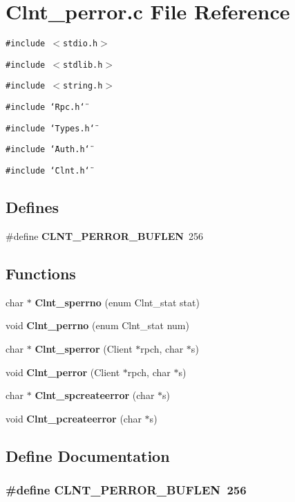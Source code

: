 \section{Clnt\_\-perror.c File Reference}
\label{Clnt__perror_8c}
{\tt \#include $<$stdio.h$>$}\par
{\tt \#include $<$stdlib.h$>$}\par
{\tt \#include $<$string.h$>$}\par
{\tt \#include \char`\"{}Rpc.h\char`\"{}}\par
{\tt \#include \char`\"{}Types.h\char`\"{}}\par
{\tt \#include \char`\"{}Auth.h\char`\"{}}\par
{\tt \#include \char`\"{}Clnt.h\char`\"{}}\par
\subsection*{Defines}
\begin{CompactItemize}
\item 
\#define {\bf CLNT\_\-PERROR\_\-BUFLEN}\ 256
\end{CompactItemize}
\subsection*{Functions}
\begin{CompactItemize}
\item 
char $\ast$ {\bf Clnt\_\-sperrno} (enum Clnt\_\-stat stat)
\item 
void {\bf Clnt\_\-perrno} (enum Clnt\_\-stat num)
\item 
char $\ast$ {\bf Clnt\_\-sperror} (Client $\ast$rpch, char $\ast$s)
\item 
void {\bf Clnt\_\-perror} (Client $\ast$rpch, char $\ast$s)
\item 
char $\ast$ {\bf Clnt\_\-spcreateerror} (char $\ast$s)
\item 
void {\bf Clnt\_\-pcreateerror} (char $\ast$s)
\end{CompactItemize}


\subsection{Define Documentation}
\subsubsection{\setlength{\rightskip}{0pt plus 5cm}\#define CLNT\_\-PERROR\_\-BUFLEN\ 256}\label{Clnt__perror_8c_a0}




